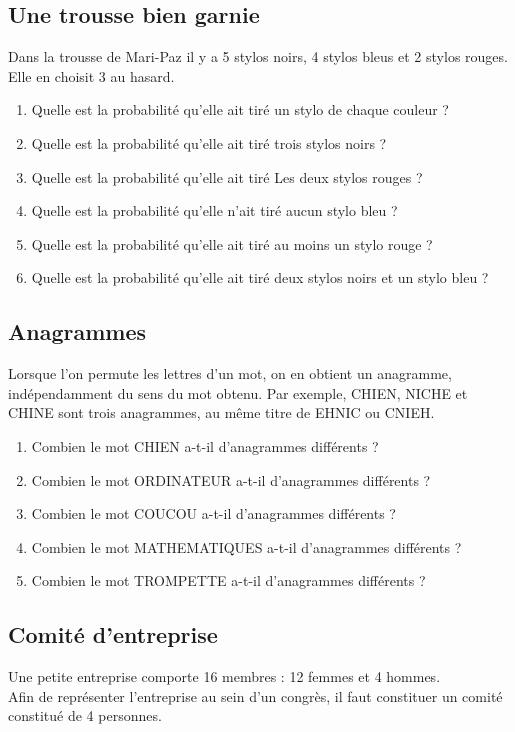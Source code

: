 \documentclass[oneside,12pt]{book}          %
\begin{document}
\subsection{Une trousse bien garnie}
Dans la trousse de Mari-Paz il y a 5 stylos noirs, 4 stylos bleus et 2 stylos rouges.\\
Elle en choisit 3 au hasard.
\begin{enumerate}
    \item Quelle est la probabilité qu'elle ait tiré un stylo de chaque couleur ?
    \item Quelle est la probabilité qu'elle ait tiré trois stylos noirs ?
    \item Quelle est la probabilité qu'elle ait tiré Les deux stylos rouges ?
    \item Quelle est la probabilité qu'elle n'ait tiré aucun stylo bleu ?
    \item Quelle est la probabilité qu'elle ait tiré au moins un stylo rouge ?
    \item Quelle est la probabilité qu'elle ait tiré deux stylos noirs et un stylo bleu ?
\end{enumerate}



\subsection{Anagrammes}
Lorsque l'on permute les lettres d'un mot, on en obtient un anagramme, indépendamment du sens du mot obtenu. Par exemple, CHIEN, NICHE et CHINE sont trois anagrammes, au même titre de EHNIC ou CNIEH.

\begin{enumerate}
    \item Combien le mot CHIEN a-t-il d'anagrammes différents ?
    \item Combien le mot ORDINATEUR a-t-il d'anagrammes différents ?
    \item Combien le mot COUCOU a-t-il d'anagrammes différents ?
    \item Combien le mot MATHEMATIQUES a-t-il d'anagrammes différents ?
    \item Combien le mot TROMPETTE a-t-il d'anagrammes différents ?
\end{enumerate}



\subsection{Comité d'entreprise}
Une petite entreprise comporte 16 membres : 12 femmes et 4 hommes.\\
Afin de représenter l'entreprise au sein d'un congrès, il faut constituer un comité constitué de 4 personnes.
\end{document}
